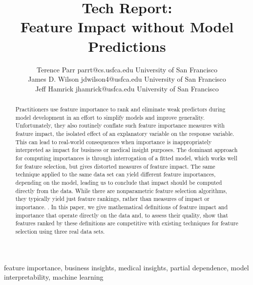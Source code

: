 \documentclass[11pt]{article}
\newcommand{\todo}[1]{{{\small\color{red}{[#1]}}}}
\begin{document}
\def\spacingset#1{\renewcommand{\baselinestretch}%
{#1}\small\normalsize} \spacingset{1}



\title{\bf Tech Report:\\
Feature Impact without Model Predictions}

\author{Terence Parr \email parrt@cs.usfca.edu
\addr University of San Francisco\\
\AND James D. Wilson \email jdwilson4@usfca.edu
\addr University of San Francisco\\
\AND Jeff Hamrick \email jhamrick@usfca.edu
      \addr University of San Francisco}

\maketitle

\begin{abstract}%
Practitioners use feature importance to rank and eliminate weak predictors during model development in an effort to simplify models and improve generality.  Unfortunately, they also routinely conflate such feature importance measures with feature impact, the isolated effect of an explanatory variable on the response variable.   This can lead to real-world consequences when importance is inappropriately interpreted as impact for business or medical insight purposes. The dominant approach for computing importances is through interrogation of a fitted model, which works well for feature selection, but gives distorted measures of feature impact. The same technique applied to the same data set can yield different feature importances, depending on the model, leading us to conclude that impact should be computed directly from the data.  While there are nonparametric feature selection algorithms, they typically yield just feature rankings, rather than measures of impact or importance. \todo{and do single variable association with response}. In this paper, we give mathematical definitions of feature impact and importance that operate directly on the data and, to assess their quality, show that features ranked by these definitions are competitive with existing techniques for feature selection using three real data sets. \todo{should we reference shap, permutation importance, mRMR in abstract?}
\end{abstract}

\begin{keywords}
feature importance, business insights, medical insights, partial dependence, model interpretability, machine learning
\end{keywords}
\end{document}

